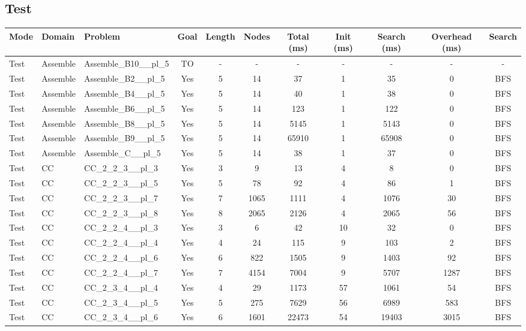 \documentclass{article}
\begin{document}
\subsection*{Test}
\begin{tabular}{lllcccccccc}
\toprule
Mode & Domain & Problem & Goal & Length & Nodes & Total (ms) & Init (ms) & Search (ms) & Overhead (ms) & Search \\
\midrule
Test & Assemble & Assemble\_B10\_\_pl\_5 & TO & - & - & - & - & - & - & - \\
Test & Assemble & Assemble\_B2\_\_pl\_5 & Yes & 5 & 14 & 37 & 1 & 35 & 0 & BFS \\
Test & Assemble & Assemble\_B4\_\_pl\_5 & Yes & 5 & 14 & 40 & 1 & 38 & 0 & BFS \\
Test & Assemble & Assemble\_B6\_\_pl\_5 & Yes & 5 & 14 & 123 & 1 & 122 & 0 & BFS \\
Test & Assemble & Assemble\_B8\_\_pl\_5 & Yes & 5 & 14 & 5145 & 1 & 5143 & 0 & BFS \\
Test & Assemble & Assemble\_B9\_\_pl\_5 & Yes & 5 & 14 & 65910 & 1 & 65908 & 0 & BFS \\
Test & Assemble & Assemble\_C\_\_pl\_5 & Yes & 5 & 14 & 38 & 1 & 37 & 0 & BFS \\
Test & CC & CC\_2\_2\_3\_\_pl\_3 & Yes & 3 & 9 & 13 & 4 & 8 & 0 & BFS \\
Test & CC & CC\_2\_2\_3\_\_pl\_5 & Yes & 5 & 78 & 92 & 4 & 86 & 1 & BFS \\
Test & CC & CC\_2\_2\_3\_\_pl\_7 & Yes & 7 & 1065 & 1111 & 4 & 1076 & 30 & BFS \\
Test & CC & CC\_2\_2\_3\_\_pl\_8 & Yes & 8 & 2065 & 2126 & 4 & 2065 & 56 & BFS \\
Test & CC & CC\_2\_2\_4\_\_pl\_3 & Yes & 3 & 6 & 42 & 10 & 32 & 0 & BFS \\
Test & CC & CC\_2\_2\_4\_\_pl\_4 & Yes & 4 & 24 & 115 & 9 & 103 & 2 & BFS \\
Test & CC & CC\_2\_2\_4\_\_pl\_6 & Yes & 6 & 822 & 1505 & 9 & 1403 & 92 & BFS \\
Test & CC & CC\_2\_2\_4\_\_pl\_7 & Yes & 7 & 4154 & 7004 & 9 & 5707 & 1287 & BFS \\
Test & CC & CC\_2\_3\_4\_\_pl\_4 & Yes & 4 & 29 & 1173 & 57 & 1061 & 54 & BFS \\
Test & CC & CC\_2\_3\_4\_\_pl\_5 & Yes & 5 & 275 & 7629 & 56 & 6989 & 583 & BFS \\
Test & CC & CC\_2\_3\_4\_\_pl\_6 & Yes & 6 & 1601 & 22473 & 54 & 19403 & 3015 & BFS \\

\end{tabular}
\end{document}
